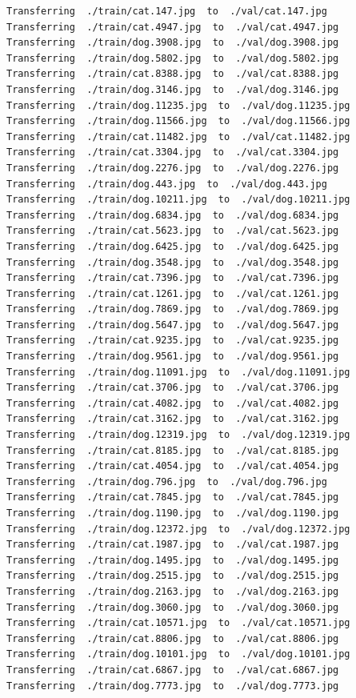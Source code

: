 \documentclass[]{book}
\theoremstyle{definition}
\theoremstyle{definition}
\theoremstyle{definition}
\theoremstyle{remark}
\begin{document}
\begin{verbatim}
Transferring  ./train/cat.147.jpg  to  ./val/cat.147.jpg
Transferring  ./train/cat.4947.jpg  to  ./val/cat.4947.jpg
Transferring  ./train/dog.3908.jpg  to  ./val/dog.3908.jpg
Transferring  ./train/dog.5802.jpg  to  ./val/dog.5802.jpg
Transferring  ./train/cat.8388.jpg  to  ./val/cat.8388.jpg
Transferring  ./train/dog.3146.jpg  to  ./val/dog.3146.jpg
Transferring  ./train/dog.11235.jpg  to  ./val/dog.11235.jpg
Transferring  ./train/dog.11566.jpg  to  ./val/dog.11566.jpg
Transferring  ./train/cat.11482.jpg  to  ./val/cat.11482.jpg
Transferring  ./train/cat.3304.jpg  to  ./val/cat.3304.jpg
Transferring  ./train/dog.2276.jpg  to  ./val/dog.2276.jpg
Transferring  ./train/dog.443.jpg  to  ./val/dog.443.jpg
Transferring  ./train/dog.10211.jpg  to  ./val/dog.10211.jpg
Transferring  ./train/dog.6834.jpg  to  ./val/dog.6834.jpg
Transferring  ./train/cat.5623.jpg  to  ./val/cat.5623.jpg
Transferring  ./train/dog.6425.jpg  to  ./val/dog.6425.jpg
Transferring  ./train/dog.3548.jpg  to  ./val/dog.3548.jpg
Transferring  ./train/cat.7396.jpg  to  ./val/cat.7396.jpg
Transferring  ./train/cat.1261.jpg  to  ./val/cat.1261.jpg
Transferring  ./train/dog.7869.jpg  to  ./val/dog.7869.jpg
Transferring  ./train/dog.5647.jpg  to  ./val/dog.5647.jpg
Transferring  ./train/cat.9235.jpg  to  ./val/cat.9235.jpg
Transferring  ./train/dog.9561.jpg  to  ./val/dog.9561.jpg
Transferring  ./train/dog.11091.jpg  to  ./val/dog.11091.jpg
Transferring  ./train/cat.3706.jpg  to  ./val/cat.3706.jpg
Transferring  ./train/cat.4082.jpg  to  ./val/cat.4082.jpg
Transferring  ./train/cat.3162.jpg  to  ./val/cat.3162.jpg
Transferring  ./train/dog.12319.jpg  to  ./val/dog.12319.jpg
Transferring  ./train/cat.8185.jpg  to  ./val/cat.8185.jpg
Transferring  ./train/cat.4054.jpg  to  ./val/cat.4054.jpg
Transferring  ./train/dog.796.jpg  to  ./val/dog.796.jpg
Transferring  ./train/cat.7845.jpg  to  ./val/cat.7845.jpg
Transferring  ./train/dog.1190.jpg  to  ./val/dog.1190.jpg
Transferring  ./train/dog.12372.jpg  to  ./val/dog.12372.jpg
Transferring  ./train/cat.1987.jpg  to  ./val/cat.1987.jpg
Transferring  ./train/dog.1495.jpg  to  ./val/dog.1495.jpg
Transferring  ./train/dog.2515.jpg  to  ./val/dog.2515.jpg
Transferring  ./train/dog.2163.jpg  to  ./val/dog.2163.jpg
Transferring  ./train/dog.3060.jpg  to  ./val/dog.3060.jpg
Transferring  ./train/cat.10571.jpg  to  ./val/cat.10571.jpg
Transferring  ./train/cat.8806.jpg  to  ./val/cat.8806.jpg
Transferring  ./train/dog.10101.jpg  to  ./val/dog.10101.jpg
Transferring  ./train/cat.6867.jpg  to  ./val/cat.6867.jpg
Transferring  ./train/dog.7773.jpg  to  ./val/dog.7773.jpg

\end{verbatim}
\end{document}
